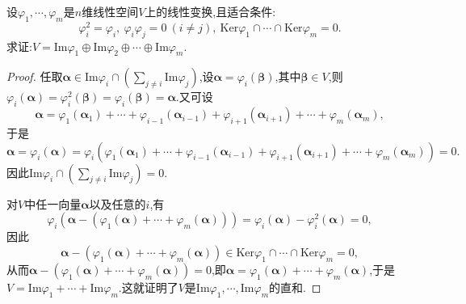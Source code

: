 \documentclass[../../main.tex]{subfiles}
\begin{document}
\begin{proposition}\label{proposition:由投影变换性质反推直和分解}
设\(\varphi_1,\cdots,\varphi_m\)是\(n\)维线性空间\(V\)上的线性变换,且适合条件:
\[
\varphi_i^2 = \varphi_i,\ \varphi_i\varphi_j = 0\ (i\neq j),\ \text{Ker}\varphi_1\cap\cdots\cap\text{Ker}\varphi_m = 0.
\]
求证:\(V = \text{Im}\varphi_1\oplus\text{Im}\varphi_2\oplus\cdots\oplus\text{Im}\varphi_m\).
\end{proposition}
\begin{proof}
任取\(\boldsymbol{\alpha}\in\text{Im}\varphi_i\cap(\sum_{j\neq i}\text{Im}\varphi_j)\),设\(\boldsymbol{\alpha}=\varphi_i(\boldsymbol{\beta})\),其中\(\boldsymbol{\beta}\in V\),则\(\varphi_i(\boldsymbol{\alpha})=\varphi_i^2(\boldsymbol{\beta})=\varphi_i(\boldsymbol{\beta})=\boldsymbol{\alpha}\).又可设
\[
\boldsymbol{\alpha}=\varphi_1(\boldsymbol{\alpha}_1)+\cdots+\varphi_{i - 1}(\boldsymbol{\alpha}_{i - 1})+\varphi_{i + 1}(\boldsymbol{\alpha}_{i + 1})+\cdots+\varphi_m(\boldsymbol{\alpha}_m),
\]
于是
\[
\boldsymbol{\alpha}=\varphi_i(\boldsymbol{\alpha})=\varphi_i(\varphi_1(\boldsymbol{\alpha}_1)+\cdots+\varphi_{i - 1}(\boldsymbol{\alpha}_{i - 1})+\varphi_{i + 1}(\boldsymbol{\alpha}_{i + 1})+\cdots+\varphi_m(\boldsymbol{\alpha}_m)) = 0.
\]
因此\(\text{Im}\varphi_i\cap(\sum_{j\neq i}\text{Im}\varphi_j)=0\).

对\(V\)中任一向量\(\boldsymbol{\alpha}\)以及任意的\(i\),有
\[
\varphi_i(\boldsymbol{\alpha}-(\varphi_1(\boldsymbol{\alpha})+\cdots+\varphi_m(\boldsymbol{\alpha})))=\varphi_i(\boldsymbol{\alpha})-\varphi_i^2(\boldsymbol{\alpha}) = 0,
\]
因此
\[
\boldsymbol{\alpha}-(\varphi_1(\boldsymbol{\alpha})+\cdots+\varphi_m(\boldsymbol{\alpha}))\in\text{Ker}\varphi_1\cap\cdots\cap\text{Ker}\varphi_m = 0,
\]
从而\(\boldsymbol{\alpha}-(\varphi_1(\boldsymbol{\alpha})+\cdots+\varphi_m(\boldsymbol{\alpha})) = 0\),即\(\boldsymbol{\alpha}=\varphi_1(\boldsymbol{\alpha})+\cdots+\varphi_m(\boldsymbol{\alpha})\),于是\(V=\text{Im}\varphi_1+\cdots+\text{Im}\varphi_m\).这就证明了\(V\)是\(\text{Im}\varphi_1,\cdots,\text{Im}\varphi_m\)的直和.
\end{proof}
\end{document}
